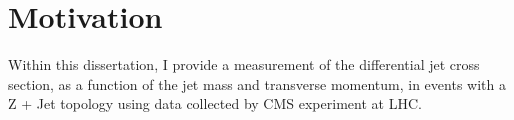 \section{Motivation}\label{secMot:ch1}

Within this dissertation, I provide a measurement of the differential jet cross section, as a function of the jet mass and transverse momentum, in events with a Z + Jet topology using data collected by CMS experiment at LHC. 
















